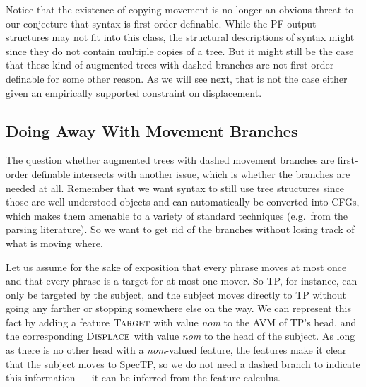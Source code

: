 Notice that the existence of copying movement is no longer an obvious threat to our conjecture that syntax is first-order definable.
While the PF output structures may not fit into this class, the structural descriptions of syntax might since they do not contain multiple copies of a tree.
But it might still be the case that these kind of augmented trees with dashed branches are not first-order definable for some other reason.
As we will see next, that is not the case either given an empirically supported constraint on displacement.

\subsection{Doing Away With Movement Branches}
The question whether augmented trees with dashed movement branches are first-order definable intersects with another issue, which is whether the branches are needed at all.
Remember that we want syntax to still use tree structures since those are well-understood objects and can automatically be converted into CFGs, which makes them amenable to a variety of standard techniques (e.g.\ from the parsing literature).
So we want to get rid of the branches without losing track of what is moving where.

Let us assume for the sake of exposition that every phrase moves at most once and that every phrase is a target for at most one mover.
So TP, for instance, can only be targeted by the subject, and the subject moves directly to TP without going any farther or stopping somewhere else on the way.
We can represent this fact by adding a feature $\text{\textsc{Target}}$ with value \emph{nom} to the AVM of TP's head, and the corresponding $\text{\textsc{Displace}}$ with value \emph{nom} to the head of the subject.
As long as there is no other head with a \emph{nom}-valued feature, the features make it clear that the subject moves to SpecTP, so we do not need a dashed branch to indicate this information --- it can be inferred from the feature calculus.

